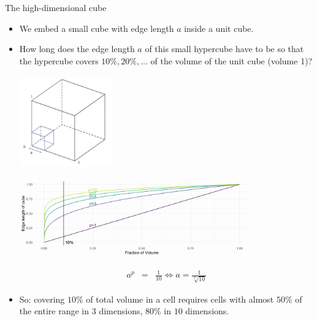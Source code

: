 \documentclass[11pt,compress,t,notes=noshow, xcolor=table]{beamer}
\begin{document}
\begin{vbframe}{The high-dimensional cube}

\begin{itemize}
  \item We embed a small cube with edge length $a$ inside a unit cube.
  \item How long does the edge length $a$ of this small hypercube have to be so that the hypercube covers $10\%, 20\%, ...$ of the volume of the unit cube (volume 1)?

  \medskip
  \begin{center}
    \includegraphics[height = 4cm, width = 4cm]{figure_man/hypercube.png}
  \end{center}

\framebreak

\vspace*{0.1cm}
\begin{center}
\includegraphics[width = 10cm ]{figure/high_dim_cube_plot.png}
\end{center}

\medskip 

  \begin{footnotesize}
  \begin{eqnarray*}
    a^p &=& \frac{1}{10} \Leftrightarrow a = \frac{1}{\sqrt[p]{10}}
  \end{eqnarray*}
  \end{footnotesize}
  \vspace*{-0.5cm}
  \item  So: covering $10\%$ of total volume in a cell requires cells with almost $50\%$ of the entire range in $3$ dimensions, $80\%$ in $10$ dimensions. 
\end{itemize}

\end{vbframe}
\end{document}
